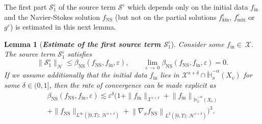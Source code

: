 \documentclass[10pt]{amsart}
\newtheorem{lemm}[theo]{Lemma}\newtheorem{prop}[theo]{Proposition}\newtheorem{coro}[theo]{Corollary}\newtheorem{conj}[theo]{Conjecture}
\theoremstyle{definition}\newtheorem{defi}[theo]{Definition}\newtheorem{rema}[theo]{Remark}\newtheorem{exam}[theo]{Example}\newtheorem{exem}[theo]{Example}\newtheorem{nota}[theo]{Notation}
\newcommand{\ini}{\mathrm{in}}
\newcommand{\ns}{\mathrm{NS}}
\newcommand{\mix}{\mathrm{mix}}
\newcommand{\kin}{\mathrm{kin}}
\newcommand{\bbH}{\mathbb{H}}
\newcommand{\XX}{\mathcal{X}}
\newcommand{\HH}{\mathcal{H}}
\renewcommand{\SS}{\mathcal{S}}
\newcommand{\HHH}{\mathscr{H}}
\newcommand{\rSSs}[1]{\HH^{#1}}
\newcommand{\SSSs}{\HHH}
\newcommand{\Sl}{X}
\newcommand{\SSl}{\XX}
\newcommand{\rSSl}[1]{\XX^{#1}}
\renewcommand*\le{\leqslant}
\newcommand*\eps{{\varepsilon}}
\begin{document}
The first part $\SS_1^\eps$ of the source term $\SS^\eps$ which depends only on the initial data $f_\ini$ and the Navier-Stokes solution $f_\ns$ (but not on the partial solutions $f^\eps_\kin$, $f^\eps_\mix$ or $g^\eps$) is estimated in this next lemma.

\begin{lemm}[\emph{\textbf{Estimate of the first source term $\SS^\eps_1$}}]\label{lem:SourceS1}
Consider some $f_\ini \in~\SSl$. The source term $\SS^\eps_1$ satisfies
\[
\| \SS^\eps_1 \|_\SSSs \le \beta_\ns\left(f_\ns, f_\ini, \eps\right), \qquad \lim_{\eps\,\to\,0}\beta_\ns(f_\ns, f_\ini, \eps)=0.
\]
If we assume additionally that the initial data $f_\ini$ lies in $\rSSl{s+\delta} \cap \dot{\bbH}^{-\alpha}_x (\Sl_v)$ for some $\delta \in (0, 1]$, then the rate of convergence can be made explicit as
\begin{multline*}
\beta_\ns(f_\ns, f_\ini, \eps) \lesssim \eps^{\delta} \Big( 1 + \| f_\ini \|_{\rSSl{s+\delta}} + \left\| f_\ini \right\|_{ \dot{\bbH}^{-\alpha}_x \left(\Sl_v \right) } \\
 + \| f_\ns \|_{ L^\infty\left([0, T);\, \rSSs{s+\delta} \right) } + \left\| \nabla_x f_\ns \right\|_{ L^2\left([0, T);\,\rSSs{s+\delta} \right) } \Big)^3.
\end{multline*}
\end{lemm}
\end{document}
